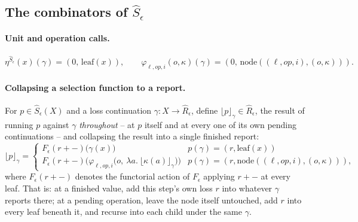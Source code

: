 \documentclass[11pt]{article}
\theoremstyle{plain}
\newcommand{\Fm}[1]{F_{#1}}
\newcommand{\Rm}[1]{\widehat{R}_{#1}}
\newcommand{\Sm}[1]{\widehat{S}_{#1}}
\newcommand{\eps}{\epsilon}
\newcommand{\op}{\mathit{op}}
\newcommand{\rpt}[2]{\lfloor #1\rfloor_{#2}}
\begin{document}
\subsection{The combinators of $\Sm\eps$}

\paragraph{Unit and operation calls.}
\[
  \eta^{\Sm\eps}(x)(\gamma) = (0,\,\mathrm{leaf}(x)), \qquad
  \varphi_{\ell,\op,i}(o,\kappa)(\gamma) = (0,\,\mathrm{node}((\ell,\op,i),(o,\kappa))).
\]

\paragraph{Collapsing a selection function to a report.} For $p\in\Sm\eps(X)$ and a loss
continuation $\gamma:X\to\Rm\eps$, define $\rpt{p}{\gamma}\in\Rm\eps$, the result of running
$p$ against $\gamma$ \emph{throughout} -- at $p$ itself and at every one of its own pending
continuations -- and collapsing the result into a single finished report:
\[
  \rpt{p}{\gamma} =
  \begin{cases}
    \Fm\eps(r+{-})\big(\gamma(x)\big) & p(\gamma) = (r,\mathrm{leaf}(x)) \\[2pt]
    \Fm\eps(r+{-})\Big(\varphi_{\ell,\op,i}\big(o,\ \lambda a.\ \rpt{\kappa(a)}{\gamma}\big)\Big) & p(\gamma) = (r,\mathrm{node}((\ell,\op,i),(o,\kappa))),
  \end{cases}
\]
where $\Fm\eps(r+{-})$ denotes the functorial action of $\Fm\eps$ applying $r+{-}$ at every
leaf. That is: at a finished value, add this step's own loss $r$ into whatever $\gamma$
reports there; at a pending operation, leave the node itself untouched, add $r$ into every
leaf beneath it, and recurse into each child under the same $\gamma$.
\end{document}
